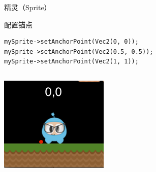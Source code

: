 \documentclass{beamer}
\begin{document}
\begin{frame}[fragile]{精灵（Sprite）}
\begin{block}{配置锚点}
\begin{verbatim}
mySprite->setAnchorPoint(Vec2(0, 0));
mySprite->setAnchorPoint(Vec2(0.5, 0.5));
mySprite->setAnchorPoint(Vec2(1, 1));
\end{verbatim}
\end{block}
\begin{columns}
\begin{column}{0.3\textwidth}
\includegraphics[width=\textwidth]
{figures/set_anchor_point_1}
\end{column}
\end{columns}
\end{frame}
\end{document}
